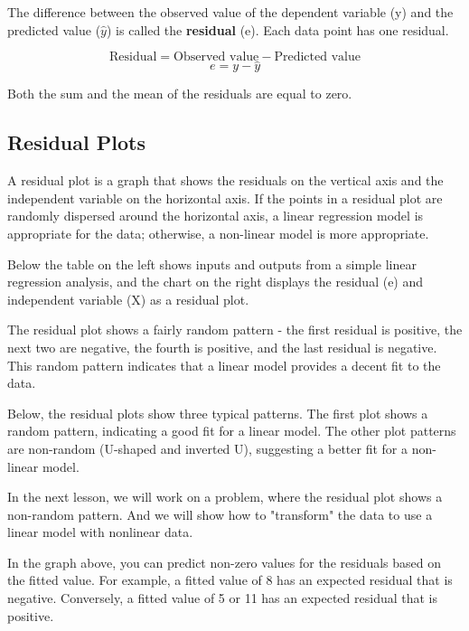 \documentclass[12pt, a4paper]{report}
\theoremstyle{plain}
\theoremstyle{definition}
\theoremstyle{remark}
\begin{document}
The difference between the observed value of the dependent variable (y) and the predicted value ($\hat{y}$) is called the \textbf{residual} (e). Each data point has one residual.

\[\mbox{Residual} = \mbox{Observed value} - \mbox{Predicted value}\] 
\[e = y - \hat{y}\]

Both the sum and the mean of the residuals are equal to zero. 

\subsection{Residual Plots}
A residual plot is a graph that shows the residuals on the vertical axis and the independent variable on the horizontal axis. If the points in a residual plot are randomly dispersed around the horizontal axis, a linear regression model is appropriate for the data; otherwise, a non-linear model is more appropriate.

Below the table on the left shows inputs and outputs from a simple linear regression analysis, and the chart on the right displays the residual (e) and independent variable (X) as a residual plot.

\newpage
The residual plot shows a fairly random pattern - the first residual is positive, the next two are negative, the fourth is positive, and the last residual is negative. This random pattern indicates that a linear model provides a decent fit to the data.

Below, the residual plots show three typical patterns. The first plot shows a random pattern, indicating a good fit for a linear model. The other plot patterns are non-random (U-shaped and inverted U), suggesting a better fit for a non-linear model.


In the next lesson, we will work on a problem, where the residual plot shows a non-random pattern. And we will show how to "transform" the data to use a linear model with nonlinear data.

\newpage
In the graph above, you can predict non-zero values for the residuals based on the fitted value. For example, a fitted value of 8 has an expected residual that is negative. Conversely, a fitted value of 5 or 11 has an expected residual that is positive.
\end{document}
